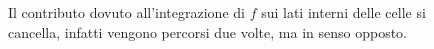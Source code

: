 \documentclass[preview]{standalone}
\begin{document}
\begin{center}
Il contributo dovuto all'integrazione di $f$ sui lati interni delle celle si \\cancella, infatti vengono percorsi due volte, ma in senso opposto.
\end{center}
\end{document}

